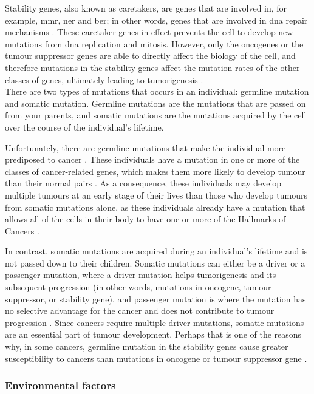 Stability genes, also known as caretakers, are genes that are involved in, for example,  \gls{mmr}, \gls{ner} and \gls{ber}; in other words, genes that are involved in \acrshort{dna} repair mechanisms \citep{Vogelstein2004a}.
These caretaker genes in effect prevents the cell to develop new mutations from \acrshort{dna} replication and mitosis.
However, only the oncogenes or the tumour suppressor genes are able to directly affect the biology of the cell, and therefore mutations in the stability genes affect the mutation rates of the other classes of genes, ultimately leading to tumorigenesis \citep{Vogelstein2004a}.
\\

\noindent
There are two types of mutations that occurs in an individual: germline mutation and somatic mutation.
Germline mutations are the mutations that are passed on from your parents, and somatic mutations are the mutations acquired by the cell over the course of the individual's lifetime.

Unfortunately, there are germline mutations that make the individual more prediposed to cancer \citep{Vogelstein2004a}.
These individuals have a mutation in one or more of the classes of cancer-related genes, which makes them more likely to develop tumour than their normal pairs \citep{Vogelstein2004a}.
As a consequence, these individuals may develop multiple tumours at an early stage of their lives than those who develop tumours from somatic mutations alone, as these individuals already have a mutation that allows all of the cells in their body to have one or more of the Hallmarks of Cancers \citep{Vogelstein2004a}.

In contrast, somatic mutations are acquired during an individual's lifetime and is not passed down to their children.
Somatic mutations can either be a driver or a passenger mutation, where a driver mutation helps tumorigenesis and its subsequent progression (in other words, mutations in oncogene, tumour suppressor, or stability gene), and passenger mutation is where the mutation has no selective advantage for the cancer and does not contribute to tumour progression \citep{Stratton2009}.
Since cancers require multiple driver mutations, somatic mutations are an essential part of tumour development.
Perhaps that is one of the reasons why, in some cancers, germline mutation in the stability genes cause greater susceptibility to cancers than mutations in oncogene or tumour suppressor gene \citep{Vogelstein2004a}.

\subsubsection{Environmental factors}
\label{ssub:environmental_factors}


